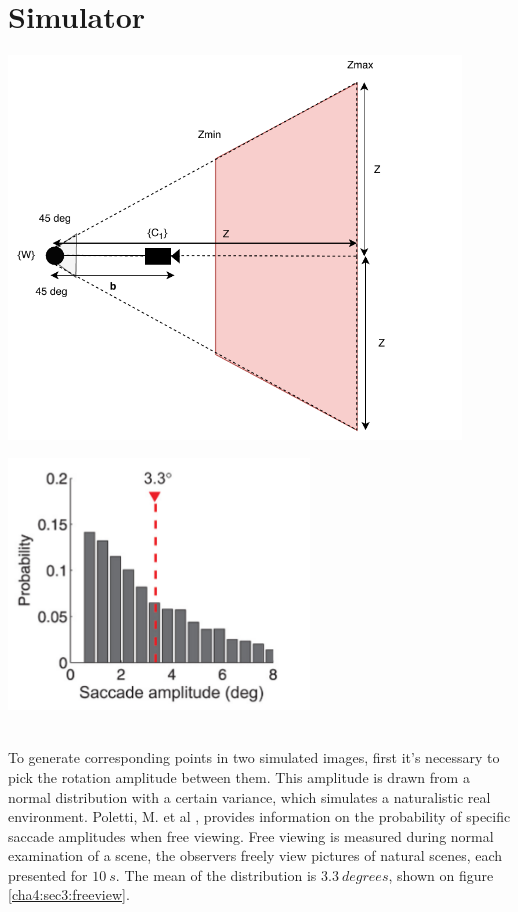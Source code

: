 \section{Simulator}
\label{rienreive}
\begin{minipage}{0.5\textwidth}
	\centering
	\includegraphics[width=0.9\textwidth]{images/rangesim.pdf}
	\label{cha4:sec3:rangesim}
\end{minipage}
\begin{minipage}{0.5\textwidth}
	\centering
	\includegraphics[width=0.6\textwidth]{images/freeview.png}
	\label{cha4:sec3:freeview}
\end{minipage}\\

To generate corresponding points in two simulated images, first it's necessary to pick the rotation amplitude between them. This amplitude is drawn from a normal distribution with a certain variance, which simulates a naturalistic real environment. Poletti, M. et al \cite{saccadeamp}, provides information on the probability of specific \gls{saccade} amplitudes when free viewing. Free viewing is measured during normal examination of a scene, the observers freely view pictures of natural scenes, each presented for $10 \ s$. The mean of the distribution is $3.3 \ degrees$, shown on figure \ref{cha4:sec3:freeview}.

